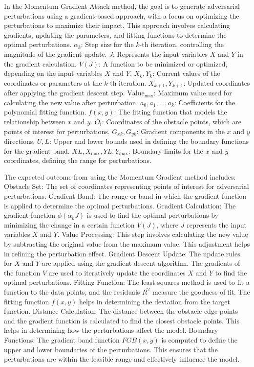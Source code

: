 
In the Momentum Gradient Attack method, the goal is to generate adversarial perturbations using a gradient-based approach, with a focus on optimizing the perturbations to maximize their impact. This approach involves calculating gradients, updating the parameters, and fitting functions to determine the optimal perturbations.
$\alpha_k$: Step size for the $k$-th iteration, controlling the magnitude of the gradient update.
$J$: Represents the input variables $X$ and $Y$ in the gradient calculation.
$V(J)$: A function to be minimized or optimized, depending on the input variables $X$ and $Y$.
$X_k, Y_k$: Current values of the coordinates or parameters at the $k$-th iteration.
$X_{k+1}, Y_{k+1}$: Updated coordinates after applying the gradient descent step.
$\text{Value}_{\text{max}}$: Maximum value used for calculating the new value after perturbation.
$a_0, a_1, \ldots, a_k$: Coefficients for the polynomial fitting function.
$f(x, y)$: The fitting function that models the relationship between $x$ and $y$.
$O_i$: Coordinates of the obstacle points, which are points of interest for perturbations.
$G_{xk}, G_{yk}$: Gradient components in the $x$ and $y$ directions.
$U, L$: Upper and lower bounds used in defining the boundary functions for the gradient band.
$XL, X_{\text{max}}, YL, Y_{\text{max}}$: Boundary limits for the $x$ and $y$ coordinates, defining the range for perturbations.

The expected outcome from using the Momentum Gradient method includes:
Obstacle Set: The set of coordinates representing points of interest for adversarial perturbations.
Gradient Band: The range or band in which the gradient function is applied to determine the optimal perturbations. 
Gradient Calculation: The gradient function $\phi(\alpha_k J)$ is used to find the optimal perturbations by minimizing the change in a certain function $V(J)$, where $J$ represents the input variables $X$ and $Y$.
Value Processing: This step involves calculating the new value by subtracting the original value from the maximum value. This adjustment helps in refining the perturbation effect.
Gradient Descent Update: The update rules for $X$ and $Y$ are applied using the gradient descent algorithm. The gradients of the function $V$ are used to iteratively update the coordinates $X$ and $Y$ to find the optimal perturbations.
Fitting Function: The least squares method is used to fit a function to the data points, and the residuals $R^2$ measure the goodness of fit. The fitting function $f(x, y)$ helps in determining the deviation from the target function.
Distance Calculation: The distance between the obstacle edge points and the gradient function is calculated to find the closest obstacle points. This helps in determining how the perturbations affect the model.
Boundary Functions: The gradient band function $FGB(x, y)$ is computed to define the upper and lower boundaries of the perturbations. This ensures that the perturbations are within the feasible range and effectively influence the model.

